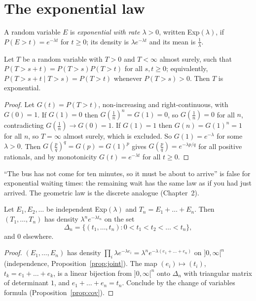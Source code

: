 \section{The exponential law}

A random variable $E$ is \emph{exponential with rate $\lambda>0$}, written Exp$(\lambda)$, if $P(E>t)=e^{-\lambda t}$ for $t\ge0$; its density is $\lambda e^{-\lambda t}$ and its mean is $\frac1\lambda$.

\begin{proposition}[memorylessness]\label{prop:memoryless}
Let $T$ be a random variable with $T>0$ and $T<\infty$ almost surely, such that $P(T>s+t)=P(T>s)P(T>t)$ for all $s,t\ge0$; equivalently,
$P(T>s+t\mid T>s)=P(T>t)$ whenever $P(T>s)>0$. Then $T$ is exponential.
\end{proposition}
\begin{proof}
Let $G(t)=P(T>t)$, non-increasing and right-continuous, with $G(0)=1$. If $G(1)=0$ then $G(\frac1n)^n=G(1)=0$, so $G(\frac1n)=0$ for all $n$, contradicting
$G(\frac1n)\to G(0)=1$. If $G(1)=1$ then $G(n)=G(1)^n=1$ for all $n$, so $T=\infty$ almost surely, which is excluded. So $G(1)=e^{-\lambda}$ for some $\lambda>0$.
Then $G(\frac pq)^q=G(p)=G(1)^p$ gives $G(\frac pq)=e^{-\lambda p/q}$ for all positive rationals, and by monotonicity $G(t)=e^{-\lambda t}$ for all $t\ge0$.
\end{proof}

``The bus has not come for ten minutes, so it must be about to arrive'' is false for exponential waiting times: the
remaining wait has the same law as if you had just arrived. The geometric law is the discrete analogue
(Chapter~2).

\begin{lemma}\label{lem:gamma}
Let $E_1,E_2,\ldots$ be independent Exp$(\lambda)$ and $T_n=E_1+\dots+E_n$. Then $(T_1,\dots,T_n)$ has density $\lambda^ne^{-\lambda t_n}$ on the set
\[
\Delta_n=\{(t_1,\dots,t_n):0<t_1<t_2<\dots<t_n\},
\]
and $0$ elsewhere.
\end{lemma}
\begin{proof}
$(E_1,\dots,E_n)$ has density $\prod_i\lambda e^{-\lambda e_i}=\lambda^ne^{-\lambda(e_1+\dots+e_n)}$ on $]0,\infty[^n$ (independence, Proposition~\ref{prop:joint}). The map $(e_i)\mapsto(t_i)$,
$t_k=e_1+\dots+e_k$, is a linear bijection from $]0,\infty[^n$ onto $\Delta_n$ with triangular matrix of determinant $1$, and $e_1+\dots+e_n=t_n$. Conclude by the
change of variables formula (Proposition~\ref{prop:cov}).
\end{proof}

